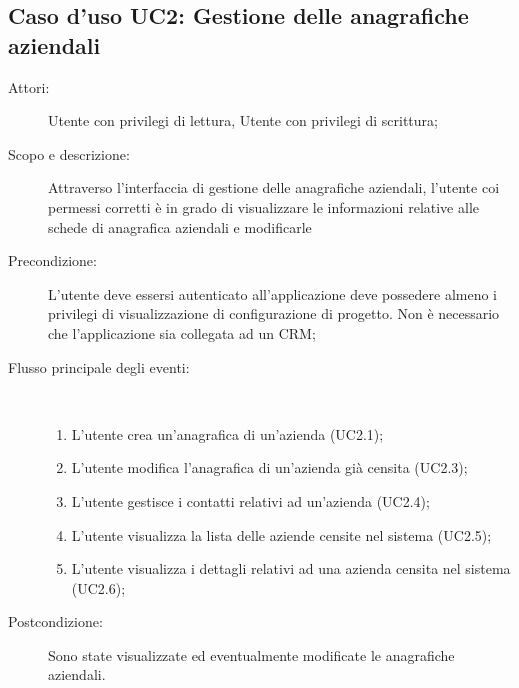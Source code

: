 \documentclass[12pt,a4paper,twoside,openright,english]{book}
\begin{document}
\subsection{Caso d'uso UC2: Gestione delle anagrafiche aziendali}\begin{description}
	\item[Attori:] Utente con privilegi di lettura, Utente con privilegi di scrittura;
	\item[Scopo e descrizione:] Attraverso l’interfaccia di gestione delle anagrafiche aziendali, l’utente coi permessi corretti è in grado di visualizzare le informazioni relative alle schede di anagrafica aziendali e modificarle
	\item[Precondizione:] L’utente deve essersi autenticato all’applicazione deve possedere almeno i privilegi di visualizzazione di configurazione di progetto. Non è necessario che l’applicazione sia collegata ad un CRM;
	
	\item[Flusso principale degli eventi:] \ 
	\begin{enumerate}
		\item L’utente crea un’anagrafica di un’azienda  (UC2.1);
		\item L’utente modifica l’anagrafica di un’azienda già censita  (UC2.3);
		\item L’utente gestisce i contatti relativi ad un’azienda  (UC2.4);
		\item L’utente visualizza la lista delle aziende censite nel sistema  (UC2.5);
		\item L’utente visualizza i dettagli relativi ad una azienda censita nel sistema  (UC2.6);
		
	\end{enumerate}
	\item[Postcondizione:] Sono state visualizzate ed eventualmente modificate le anagrafiche aziendali.
\end{description}

\hypertarget{UC1.2}{}
\end{document}
